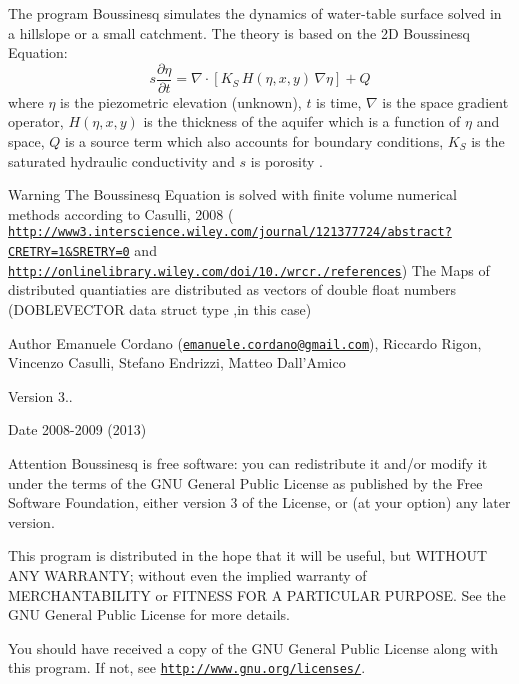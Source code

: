 The program Boussinesq simulates the dynamics of water-\/table surface solved in a hillslope or a small catchment. The theory is based on the 2\-D Boussinesq Equation\-: \[ s\frac {\partial \eta} {\partial t} = \nabla \cdot \left[ K_S \, H (\eta,x,y) \, \nabla \eta \right]+Q \] where $ \eta $ is the piezometric elevation (unknown), $ t $ is time, $ \nabla $ is the space gradient operator, $ H(\eta,x,y) $ is the thickness of the aquifer which is a function of $ \eta $ and space, $Q $ is a source term which also accounts for boundary conditions, $K_S $ is the saturated hydraulic conductivity and $s $ is porosity . \begin{DoxyWarning}{Warning}
The Boussinesq Equation is solved with finite volume numerical methods according to Casulli, 2008 ( \href{http://www3.interscience.wiley.com/journal/121377724/abstract?CRETRY=1&SRETRY=0}{\tt http\-://www3.\-interscience.\-wiley.\-com/journal/121377724/abstract?\-C\-R\-E\-T\-R\-Y=1\&\-S\-R\-E\-T\-R\-Y=0} and \href{http://onlinelibrary.wiley.com/doi/10.1002/wrcr.20072/references}{\tt http\-://onlinelibrary.\-wiley.\-com/doi/10./wrcr./references}) The Maps of distributed quantiaties are distributed as vectors of double float numbers (D\-O\-B\-L\-E\-V\-E\-C\-T\-O\-R data struct type ,in this case)
\end{DoxyWarning}
\begin{DoxyAuthor}{Author}
Emanuele Cordano (\href{mailto:emanuele.cordano@gmail.com}{\tt emanuele.\-cordano@gmail.\-com}), Riccardo Rigon, Vincenzo Casulli, Stefano Endrizzi, Matteo Dall'Amico
\end{DoxyAuthor}
\begin{DoxyVersion}{Version}
3..
\end{DoxyVersion}
\begin{DoxyDate}{Date}
2008-\/2009 (2013)
\end{DoxyDate}
\begin{DoxyAttention}{Attention}
Boussinesq is free software\-: you can redistribute it and/or modify it under the terms of the G\-N\-U General Public License as published by the Free Software Foundation, either version 3 of the License, or (at your option) any later version.
\end{DoxyAttention}
This program is distributed in the hope that it will be useful, but W\-I\-T\-H\-O\-U\-T A\-N\-Y W\-A\-R\-R\-A\-N\-T\-Y; without even the implied warranty of M\-E\-R\-C\-H\-A\-N\-T\-A\-B\-I\-L\-I\-T\-Y or F\-I\-T\-N\-E\-S\-S F\-O\-R A P\-A\-R\-T\-I\-C\-U\-L\-A\-R P\-U\-R\-P\-O\-S\-E. See the G\-N\-U General Public License for more details.

You should have received a copy of the G\-N\-U General Public License along with this program. If not, see \href{http://www.gnu.org/licenses/}{\tt http\-://www.\-gnu.\-org/licenses/}. 